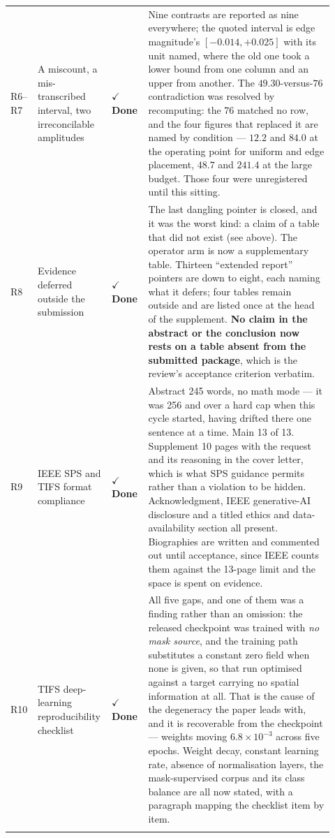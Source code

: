 \documentclass[11pt]{article}
\newcommand{\done}{\textcolor{DoneGreen}{\textbf{$\checkmark$ Done}}}
\begin{document}
\begin{longtable}{@{}p{0.05\linewidth}p{0.19\linewidth}p{0.11\linewidth}p{0.57\linewidth}@{}}
R6--R7 & A miscount, a mis-transcribed interval, two irreconcilable
amplitudes & \done & Nine contrasts are reported as nine everywhere; the
quoted interval is edge magnitude's $[-0.014,+0.025]$ with its unit named,
where the old one took a lower bound from one column and an upper from
another. The $49.30$-versus-$76$ contradiction was resolved by recomputing:
the $76$ matched no row, and the four figures that replaced it are named by
condition --- $12.2$ and $84.0$ at the operating point for uniform and edge
placement, $48.7$ and $241.4$ at the large budget. Those four were unregistered
until this sitting. \\
\addlinespace

R8 & Evidence deferred outside the submission & \done & The last dangling
pointer is closed, and it was the worst kind: a claim of a table that did not
exist (see above). The operator arm is now a supplementary table. Thirteen ``extended
report'' pointers are down to eight, each naming what it defers; four tables
remain outside and are listed once at the head of the supplement. \textbf{No
claim in the abstract or the conclusion now rests on a table absent from the
submitted package}, which is the review's acceptance criterion verbatim. \\
\addlinespace

R9 & IEEE SPS and TIFS format compliance & \done & Abstract 245 words, no math
mode --- it was 256 and over a hard cap when this cycle started, having drifted
there one sentence at a time. Main 13 of 13. Supplement 10 pages with the
request and its reasoning in the cover letter, which is what SPS guidance
permits rather than a violation to be hidden. Acknowledgment, IEEE
generative-AI disclosure and a titled ethics and data-availability section all
present. Biographies are written and commented out until acceptance, since
IEEE counts them against the 13-page limit and the space is spent on evidence. \\
\addlinespace

R10 & TIFS deep-learning reproducibility checklist & \done & All five gaps, and
one of them was a finding rather than an omission: the released checkpoint was
trained with \emph{no mask source}, and the training path substitutes a
constant zero field when none is given, so that run optimised against a target
carrying no spatial information at all. That is the cause of the degeneracy the
paper leads with, and it is recoverable from the checkpoint --- weights moving
$6.8\times10^{-3}$ across five epochs. Weight decay, constant learning rate,
absence of normalisation layers, the mask-supervised corpus and its class
balance are all now stated, with a paragraph mapping the checklist item by
item. \\
\addlinespace


\end{longtable}
\end{document}
